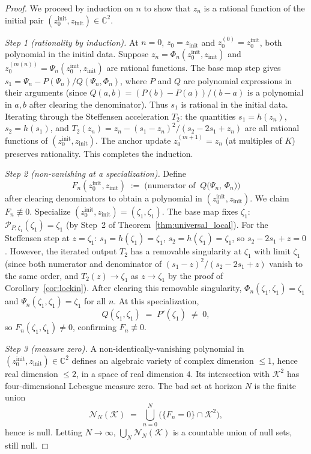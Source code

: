 \documentclass[11pt,a4paper]{article}
\theoremstyle{definition}
\newcommand{\CC}{\mathbb{C}}
\begin{document}
\begin{proof}
We proceed by induction on $n$ to show that $z_n$ is a rational function of the initial pair $(z_0^{\mathrm{init}}, z_{\mathrm{init}}) \in \CC^2$.

\emph{Step 1 (rationality by induction).}  At $n = 0$, $z_0 = z_{\mathrm{init}}$ and $z_0^{(0)} = z_0^{\mathrm{init}}$, both polynomial in the initial data.  Suppose $z_n = \Phi_n(z_0^{\mathrm{init}}, z_{\mathrm{init}})$ and $z_0^{(m(n))} = \Psi_n(z_0^{\mathrm{init}}, z_{\mathrm{init}})$ are rational functions.  The base map step gives $s_1 = \Psi_n - P(\Psi_n)/Q(\Psi_n, \Phi_n)$, where $P$ and $Q$ are polynomial expressions in their arguments (since $Q(a,b) = (P(b)-P(a))/(b-a)$ is a polynomial in $a, b$ after clearing the denominator).  Thus $s_1$ is rational in the initial data.  Iterating through the Steffensen acceleration $T_2$: the quantities $s_1 = h(z_n)$, $s_2 = h(s_1)$, and $T_2(z_n) = z_n - (s_1 - z_n)^2/(s_2 - 2s_1 + z_n)$ are all rational functions of $(z_0^{\mathrm{init}}, z_{\mathrm{init}})$.  The anchor update $z_0^{(m+1)} = z_n$ (at multiples of $K$) preserves rationality.  This completes the induction.

\emph{Step 2 (non-vanishing at a specialization).}  Define
\[
  F_n(z_0^{\mathrm{init}}, z_{\mathrm{init}}) \;:=\; \bigl(\text{numerator of}\;\; Q\!\bigl(\Psi_n,\, \Phi_n\bigr)\bigr)
\]
after clearing denominators to obtain a polynomial in $(z_0^{\mathrm{init}}, z_{\mathrm{init}})$.  We claim $F_n \not\equiv 0$.  Specialize $(z_0^{\mathrm{init}}, z_{\mathrm{init}}) = (\zeta_1, \zeta_1)$.  The base map fixes $\zeta_1$: $\mathcal{P}_{P,\zeta_1}(\zeta_1) = \zeta_1$ (by Step~2 of Theorem~\ref{thm:universal_local}).  For the Steffensen step at $z = \zeta_1$: $s_1 = h(\zeta_1) = \zeta_1$, $s_2 = h(\zeta_1) = \zeta_1$, so $s_2 - 2s_1 + z = 0$.  However, the iterated output $T_2$ has a removable singularity at $\zeta_1$ with limit $\zeta_1$ (since both numerator and denominator of $(s_1 - z)^2/(s_2 - 2s_1 + z)$ vanish to the same order, and $T_2(z) \to \zeta_1$ as $z \to \zeta_1$ by the proof of Corollary~\ref{cor:lockin}).  After clearing this removable singularity, $\Phi_n(\zeta_1, \zeta_1) = \zeta_1$ and $\Psi_n(\zeta_1, \zeta_1) = \zeta_1$ for all $n$.  At this specialization,
\[
  Q(\zeta_1, \zeta_1) \;=\; P'(\zeta_1) \;\neq\; 0,
\]
so $F_n(\zeta_1,\zeta_1) \neq 0$, confirming $F_n \not\equiv 0$.

\emph{Step 3 (measure zero).}  A non-identically-vanishing polynomial in $(z_0^{\mathrm{init}}, z_{\mathrm{init}}) \in \CC^2$ defines an algebraic variety of complex dimension $\leq 1$, hence real dimension $\leq 2$, in a space of real dimension $4$.  Its intersection with $\mathcal{K}^2$ has four-dimensional Lebesgue measure zero.  The bad set at horizon $N$ is the finite union
\[
  \mathcal{N}_N(\mathcal{K}) \;=\; \bigcup_{n=0}^{N} \bigl(\{F_n = 0\} \cap \mathcal{K}^2\bigr),
\]
hence is null.  Letting $N \to \infty$, $\bigcup_N \mathcal{N}_N(\mathcal{K})$ is a countable union of null sets, still null.
\end{proof}
\end{document}
